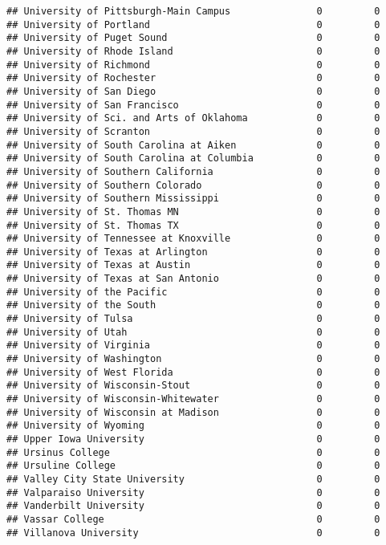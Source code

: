 \documentclass[
]{article}
\begin{document}
\begin{verbatim}
## University of Pittsburgh-Main Campus               0         0
## University of Portland                             0         0
## University of Puget Sound                          0         0
## University of Rhode Island                         0         0
## University of Richmond                             0         0
## University of Rochester                            0         0
## University of San Diego                            0         0
## University of San Francisco                        0         0
## University of Sci. and Arts of Oklahoma            0         0
## University of Scranton                             0         0
## University of South Carolina at Aiken              0         0
## University of South Carolina at Columbia           0         0
## University of Southern California                  0         0
## University of Southern Colorado                    0         0
## University of Southern Mississippi                 0         0
## University of St. Thomas MN                        0         0
## University of St. Thomas TX                        0         0
## University of Tennessee at Knoxville               0         0
## University of Texas at Arlington                   0         0
## University of Texas at Austin                      0         0
## University of Texas at San Antonio                 0         0
## University of the Pacific                          0         0
## University of the South                            0         0
## University of Tulsa                                0         0
## University of Utah                                 0         0
## University of Virginia                             0         0
## University of Washington                           0         0
## University of West Florida                         0         0
## University of Wisconsin-Stout                      0         0
## University of Wisconsin-Whitewater                 0         0
## University of Wisconsin at Madison                 0         0
## University of Wyoming                              0         0
## Upper Iowa University                              0         0
## Ursinus College                                    0         0
## Ursuline College                                   0         0
## Valley City State University                       0         0
## Valparaiso University                              0         0
## Vanderbilt University                              0         0
## Vassar College                                     0         0
## Villanova University                               0         0

\end{verbatim}
\end{document}
